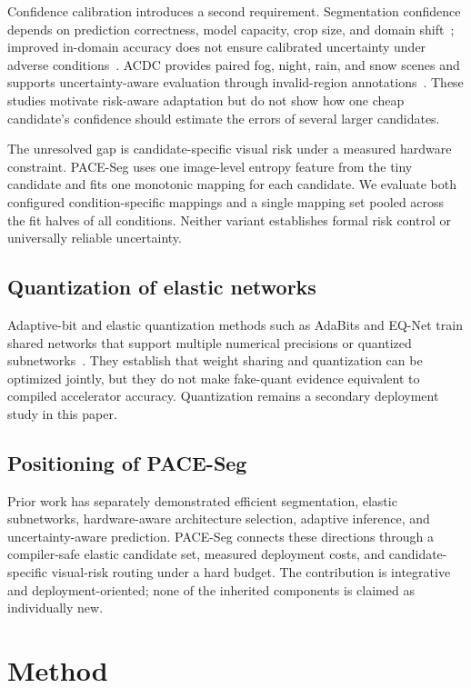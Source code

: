 \documentclass[a4paper,review,12pt]{elsarticle}
\newcommand{\method}{PACE-Seg}
\begin{document}
Confidence calibration introduces a second requirement. Segmentation confidence depends on prediction correctness, model capacity, crop size, and domain shift~\cite{wang2023calibrating}; improved in-domain accuracy does not ensure calibrated uncertainty under adverse conditions~\cite{dejorge2023reliability}. ACDC provides paired fog, night, rain, and snow scenes and supports uncertainty-aware evaluation through invalid-region annotations~\cite{sakaridis2021acdc}. These studies motivate risk-aware adaptation but do not show how one cheap candidate's confidence should estimate the errors of several larger candidates.

The unresolved gap is candidate-specific visual risk under a measured hardware constraint. \method{} uses one image-level entropy feature from the tiny candidate and fits one monotonic mapping for each candidate. We evaluate both configured condition-specific mappings and a single mapping set pooled across the fit halves of all conditions. Neither variant establishes formal risk control or universally reliable uncertainty.

\subsection{Quantization of elastic networks}

Adaptive-bit and elastic quantization methods such as AdaBits and EQ-Net train shared networks that support multiple numerical precisions or quantized subnetworks~\cite{jin2020adabits,xu2023eqnet}. They establish that weight sharing and quantization can be optimized jointly, but they do not make fake-quant evidence equivalent to compiled accelerator accuracy. Quantization remains a secondary deployment study in this paper.

\subsection{Positioning of PACE-Seg}

Prior work has separately demonstrated efficient segmentation, elastic subnetworks, hardware-aware architecture selection, adaptive inference, and uncertainty-aware prediction. \method{} connects these directions through a compiler-safe elastic candidate set, measured deployment costs, and candidate-specific visual-risk routing under a hard budget. The contribution is integrative and deployment-oriented; none of the inherited components is claimed as individually new.

\section{Method}
\label{sec:method}
\end{document}
